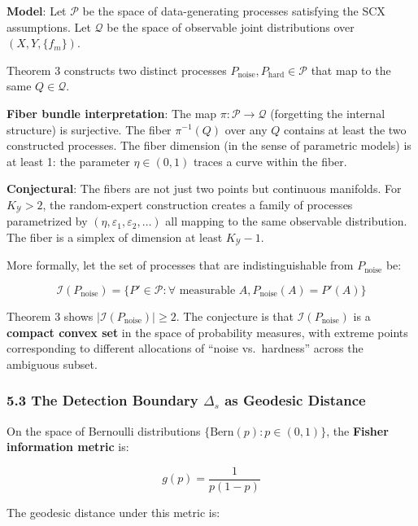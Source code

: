 \documentclass[
  12pt,
]{article}
\begin{document}
\textbf{Model}: Let \(\mathcal{P}\) be the space of data-generating
processes satisfying the SCX assumptions. Let \(\mathcal{Q}\) be the
space of observable joint distributions over \((X, Y, \{f_m\})\).

Theorem 3 constructs two distinct processes
\(P_{\text{noise}}, P_{\text{hard}} \in \mathcal{P}\) that map to the
same \(Q \in \mathcal{Q}\).

\textbf{Fiber bundle interpretation}: The map
\(\pi: \mathcal{P} \to \mathcal{Q}\) (forgetting the internal structure)
is surjective. The fiber \(\pi^{-1}(Q)\) over any \(Q\) contains at
least the two constructed processes. The fiber dimension (in the sense
of parametric models) is at least 1: the parameter \(\eta \in (0, 1)\)
traces a curve within the fiber.

\textbf{Conjectural}: The fibers are not just two points but continuous
manifolds. For \(K_{\mathcal{Y}} > 2\), the random-expert construction
creates a family of processes parametrized by
\((\eta, \varepsilon_1, \varepsilon_2, \dots)\) all mapping to the same
observable distribution. The fiber is a simplex of dimension at least
\(K_{\mathcal{Y}} - 1\).

More formally, let the set of processes that are indistinguishable from
\(P_{\text{noise}}\) be:

\[\mathcal{I}(P_{\text{noise}}) = \{P' \in \mathcal{P} : \forall \text{ measurable } A, P_{\text{noise}}(A) = P'(A)\}\]

Theorem 3 shows \(|\mathcal{I}(P_{\text{noise}})| \geq 2\). The
conjecture is that \(\mathcal{I}(P_{\text{noise}})\) is a
\textbf{compact convex set} in the space of probability measures, with
extreme points corresponding to different allocations of ``noise
vs.~hardness'' across the ambiguous subset.

\subsubsection{\texorpdfstring{5.3 The Detection Boundary \(\Delta_s\)
as Geodesic
Distance}{5.3 The Detection Boundary \textbackslash Delta\_s as Geodesic Distance}}\label{the-detection-boundary-delta_s-as-geodesic-distance}

On the space of Bernoulli distributions
\(\{\text{Bern}(p) : p \in (0,1)\}\), the \textbf{Fisher information
metric} is:

\[g(p) = \frac{1}{p(1-p)}\]

The geodesic distance under this metric is:
\end{document}
